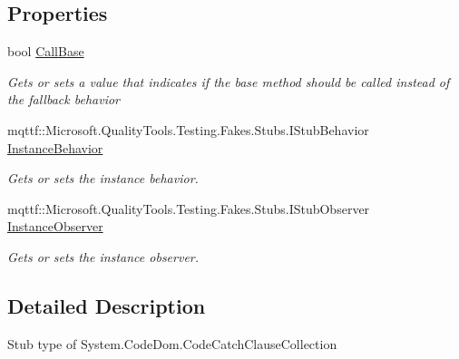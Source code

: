 \subsection*{Properties}
\begin{DoxyCompactItemize}
\item 
bool \hyperlink{class_system_1_1_code_dom_1_1_fakes_1_1_stub_code_catch_clause_collection_a6afbdd51cd7d10d3beac8a945fd64c9e}{Call\-Base}
\begin{DoxyCompactList}\small\item\em Gets or sets a value that indicates if the base method should be called instead of the fallback behavior\end{DoxyCompactList}\item 
mqttf\-::\-Microsoft.\-Quality\-Tools.\-Testing.\-Fakes.\-Stubs.\-I\-Stub\-Behavior \hyperlink{class_system_1_1_code_dom_1_1_fakes_1_1_stub_code_catch_clause_collection_a15426d33731bbad69d1a65cd9a26a247}{Instance\-Behavior}
\begin{DoxyCompactList}\small\item\em Gets or sets the instance behavior.\end{DoxyCompactList}\item 
mqttf\-::\-Microsoft.\-Quality\-Tools.\-Testing.\-Fakes.\-Stubs.\-I\-Stub\-Observer \hyperlink{class_system_1_1_code_dom_1_1_fakes_1_1_stub_code_catch_clause_collection_a5c3a6e33053d734815d36258c674bdae}{Instance\-Observer}
\begin{DoxyCompactList}\small\item\em Gets or sets the instance observer.\end{DoxyCompactList}\end{DoxyCompactItemize}


\subsection{Detailed Description}
Stub type of System.\-Code\-Dom.\-Code\-Catch\-Clause\-Collection



